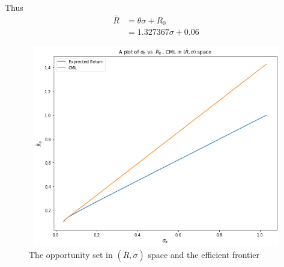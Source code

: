 \documentclass[12pt,a4paper]{article}
\begin{document}
	Thus 
			\begin{align*}
						\bar{R}   &=  \theta  \sigma  + R_0\\
											&=  1.327367 \sigma + 0.06
			\end{align*}
	 \begin{figure}[!h]
									\includegraphics[width=430pt,  height=250pt]{./graphics/q001.png}
										\caption{The opportunity set in $(\bar{R}, \sigma)$ space and the efficient frontier}
										\label{fig:q1}
	\end{figure}
	\pagebreak
\end{document}
